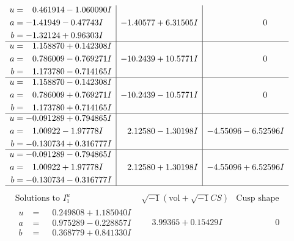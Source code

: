 \documentclass[1p]{elsarticle_modified}
\theoremstyle{definition}
\newcommand{\I}{\sqrt{-1}}
\begin{document}
$$\begin{array}{c|c|c}
\begin{aligned}
u &= \phantom{-}0.461914 - 1.060090 I \\
a &= -1.41949 - 0.47743 I \\
b &= -1.32124 + 0.96303 I\end{aligned}
 & -1.40577 + 6.31505 I & \phantom{-0.000000 } 0 \\ \hline\begin{aligned}
u &= \phantom{-}1.158870 + 0.142308 I \\
a &= \phantom{-}0.786009 - 0.769271 I \\
b &= \phantom{-}1.173780 - 0.714165 I\end{aligned}
 & -10.2439 + 10.5771 I & \phantom{-0.000000 } 0 \\ \hline\begin{aligned}
u &= \phantom{-}1.158870 - 0.142308 I \\
a &= \phantom{-}0.786009 + 0.769271 I \\
b &= \phantom{-}1.173780 + 0.714165 I\end{aligned}
 & -10.2439 - 10.5771 I & \phantom{-0.000000 } 0 \\ \hline\begin{aligned}
u &= -0.091289 + 0.794865 I \\
a &= \phantom{-}1.00922 - 1.97778 I \\
b &= -0.130734 + 0.316777 I\end{aligned}
 & \phantom{-}2.12580 - 1.30198 I & -4.55096 - 6.52596 I \\ \hline\begin{aligned}
u &= -0.091289 - 0.794865 I \\
a &= \phantom{-}1.00922 + 1.97778 I \\
b &= -0.130734 - 0.316777 I\end{aligned}
 & \phantom{-}2.12580 + 1.30198 I & -4.55096 + 6.52596 I\\
 \hline 
 \end{array}$$\newpage$$\begin{array}{c|c|c}  
\text{Solutions to }I^u_{1}& \I (\text{vol} + \sqrt{-1}CS) & \text{Cusp shape}\\
 \hline 
\begin{aligned}
u &= \phantom{-}0.249808 + 1.185040 I \\
a &= \phantom{-}0.975289 - 0.228857 I \\
b &= \phantom{-}0.368779 + 0.841330 I\end{aligned}
 & \phantom{-}3.99365 + 0.15429 I & \phantom{-0.000000 } 0 \\ \hline\begin{aligned}

\end{aligned}
\end{array}$$
\end{document}
